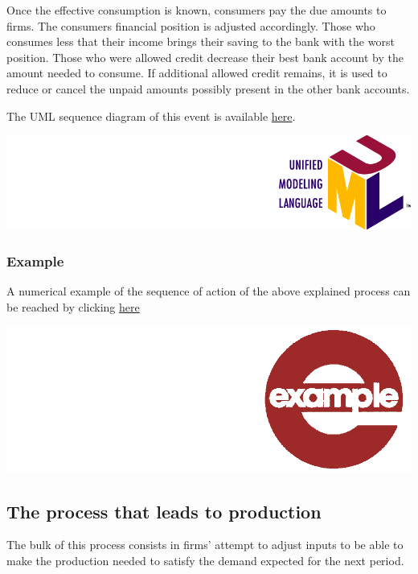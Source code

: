 \documentclass{book}
\newcommand{\doclocation}{file:///Users/giulioni/Documents/workspace/gabriele/docs}
\begin{document}
Once the effective consumption is known, consumers pay the due amounts to firms.
The consumers financial position is adjusted accordingly.
Those who consumes less that their income brings their saving to the bank with the worst position. Those who were allowed credit decrease their best bank account by the amount needed to consume. If additional allowed credit remains, it is used to reduce or cancel the unpaid amounts possibly present in the other bank accounts.   

The UML sequence diagram of this event is available \href{\doclocation/umldoc/updateBankAccountAccordingToEffectiveConsumption.html}{here}.
\begin{marginfigure}
	\includegraphics[scale=0.1]{uml.png}
\end{marginfigure}

\subsubsection{Example}

A numerical example of the sequence of action of the above explained process can be reached by clicking \href{\doclocation/latexdoc/example_consumer_bank_relationship.html}{here}
\begin{marginfigure}
\hskip8mm	\includegraphics[scale=0.07]{example.png}
\end{marginfigure}


\subsection{The process that leads to production}

The bulk of this process consists in firms' attempt to adjust inputs to be able to make the production needed to satisfy the demand expected for the next period.
\end{document}
